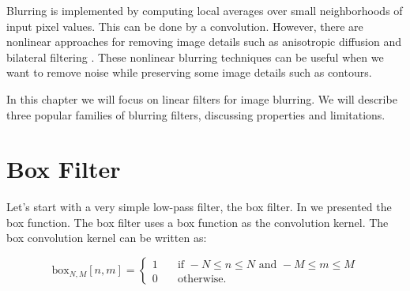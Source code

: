 Blurring is implemented by computing local averages over small neighborhoods of input pixel values. This can be done by a convolution. However, there are nonlinear approaches for removing image details such as anisotropic diffusion \cite{Perona1990} and bilateral filtering \cite{Paris2009}. These nonlinear blurring techniques can be useful when we want to remove noise while preserving some image details such as contours.

In this chapter we will focus on linear filters for image blurring. We will describe three popular families of blurring filters, discussing properties and limitations.



%
%
%
%



\section{Box Filter}


Let's start with a very simple low-pass filter, the box filter.
 In \sect{\ref{sec:box_function}} we presented the box function. The box filter uses a box function as the convolution kernel.
The box convolution kernel can be written as:

\begin{equation}
	\text{box}_{N,M} \left[n,m \right] =
	\begin{cases}
		1 & \quad \text{if } -N \leq n \leq N  \text{~and~}  -M \leq m \leq M \\
		0 & \quad \text{otherwise.}
	\end{cases}
\end{equation}

